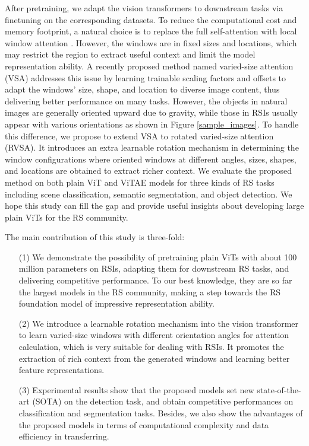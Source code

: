 \documentclass[10pt, journal,twoside]{IEEEtran}
\begin{document}
After pretraining, we adapt the vision transformers to downstream tasks via finetuning on the corresponding datasets. To reduce the computational cost and memory footprint, a natural choice is to replace the full self-attention with local window attention \cite{vitdet}. However, the windows are in fixed sizes and locations, which may restrict the region to extract useful context and limit the model representation ability. A recently proposed method named varied-size attention (VSA) \cite{zhang2022vsa} addresses this issue by learning trainable scaling factors and offsets to adapt the windows' size, shape, and location to diverse image content, thus delivering better performance on many tasks. However, the objects in natural images are generally oriented upward due to gravity, while those in RSIs usually appear with various orientations as shown in Figure \ref{sample_images}. To handle this difference, we propose to extend VSA to rotated varied-size attention (RVSA). It introduces an extra learnable rotation mechanism in determining the window configurations where oriented windows at different angles, sizes, shapes, and locations are obtained to extract richer context. We evaluate the proposed method on both plain ViT \cite{vit} and ViTAE \cite{vitae_v2} models for three kinds of RS tasks including scene classification, semantic segmentation, and object detection. We hope this study can fill the gap and provide useful insights about developing large plain ViTs for the RS community.


The main contribution of this study is three-fold:
\begin{itemize}
  \item[(1)] We demonstrate the possibility of pretraining plain ViTs with about 100 million parameters on RSIs, adapting them for downstream RS tasks, and delivering competitive performance. To our best knowledge, they are so far the largest models in the RS community, making a step towards the RS foundation model \cite{yu2022coca, yuan2021florence, bommasani2021opportunities, ringmo} of impressive representation ability.
  \item[(2)] We introduce a learnable rotation mechanism into the vision transformer to learn varied-size windows with different orientation angles for attention calculation, which is very suitable for dealing with RSIs. It promotes the extraction of rich context from the generated windows and learning better feature representations.
  \item[(3)] Experimental results show that the proposed models set new state-of-the-art (SOTA) on the detection task, and obtain competitive performances on classification and segmentation tasks. Besides, we also show the advantages of the proposed models in terms of computational complexity and data efficiency in transferring.
 \end{itemize}
\end{document}
